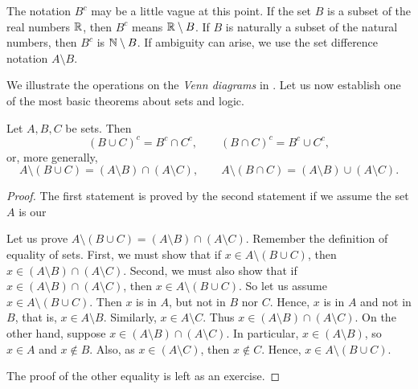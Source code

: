 The notation $B^c$ may be a little vague at this point.  If
the set $B$ is a subset of the real numbers ${\mathbb{R}}$, then $B^c$ means
${\mathbb{R}} \setminus B$.  If $B$ is naturally a subset of the natural numbers,
then $B^c$
is ${\mathbb{N}} \setminus B$.  If ambiguity can arise, we 
use the set difference notation $A \setminus B$.

\begin{myfigureht}
\caption{Venn diagrams of set operations, the result of the operation is
shaded.\label{figsetop}}
\end{myfigureht}
We illustrate the operations on the
\emph{Venn diagrams} in .
Let us now establish one of the most basic theorems about sets and logic.

\begin{thm}[DeMorgan]
Let $A, B, C$ be sets.  Then
\begin{equation*}
{(B \cup C)}^c = B^c \cap C^c , \qquad
{(B \cap C)}^c = B^c \cup C^c ,
\end{equation*}
or, more generally,
\begin{equation*}
A \setminus (B \cup C) = (A \setminus B) \cap (A \setminus C) , 
\qquad
A \setminus (B \cap C) = (A \setminus B) \cup (A \setminus C) .
\end{equation*}
\end{thm}

\begin{proof}
The first statement is proved by the second statement if we
assume the set $A$ is our 

Let us prove $A \setminus (B \cup C) = (A \setminus B) \cap (A \setminus C)$.
Remember the definition of equality of sets.  First, we must show that
if $x \in A \setminus (B \cup C)$, then
$x \in (A \setminus B) \cap (A \setminus C)$.  Second, we must also show that
if $x \in (A \setminus B) \cap (A \setminus C)$, then
$x \in A \setminus (B \cup C)$.
So let us assume $x \in A \setminus (B \cup C)$.  Then $x$ is in 
$A$, but not in $B$ nor $C$.  Hence, $x$ is in $A$ and not in $B$, that is,
$x \in A \setminus B$.  Similarly, $x \in A \setminus C$.  Thus
$x \in (A \setminus B) \cap (A \setminus C)$.
On the other hand, suppose 
$x \in (A \setminus B) \cap (A \setminus C)$.  In particular,
$x \in (A \setminus B)$, so 
$x \in A$ and $x \notin B$.  Also, as $x \in (A \setminus C)$, then $x \notin C$.
Hence, $x \in A \setminus (B \cup C)$.

The proof of the other equality is left as an exercise.
\end{proof}

